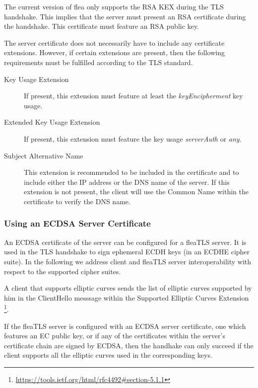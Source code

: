 \documentclass[a4paper,11pt]{scrartcl}
\begin{document}
The current version of flea only supports the RSA KEX during the TLS handshake.
This implies that the server must present an RSA certificate during the
handshake. This certificate must feature an RSA public key.

The server certificate does not necessarily have to include any certificate
extensions. However, if certain extensions are present, then the following
requirements must be fulfilled according to the TLS standard.
\begin{description}
  \item [Key Usage Extension] If present, this extension must feature at least
    the \emph{keyEncipherment} key usage.
  \item [Extended Key Usage Extension] If present, this extension must feature
    the key usage \emph{serverAuth} or \emph{any}.
  \item [Subject Alternative Name] This extension is recommended to be included
    in the certificate and to include either the IP address or the DNS name of
    the server. If this extension is not present, the client will use the Common
Name within the certificate to verify the DNS name.
\end{description}

\subsubsection{Using an ECDSA Server Certificate}

An ECDSA certificate of the server can be configured for a fleaTLS server. It is used in the TLS handshake to sign
ephemeral ECDH keys (\ie in an ECDHE cipher suite). In the following we address
client and fleaTLS server interoperability with respect to the supported cipher
suites.

A client that supports
elliptic curves sends the list of elliptic curves supported  by him in the
ClientHello messsage within the Supported Elliptic
   Curves Extension
   \footnote{\url{https://tools.ietf.org/html/rfc4492\#section-5.1.1}}. 
   
   If the fleaTLS server is configured with an ECDSA server certificate, \ie one
   which features an EC public key,  or if any of the certificates within the
   server's certificate chain are signed by ECDSA, then the handhake can only
   succeed if the client supports all the elliptic curves used in the
   corresponding keys. 

   
\end{document}
